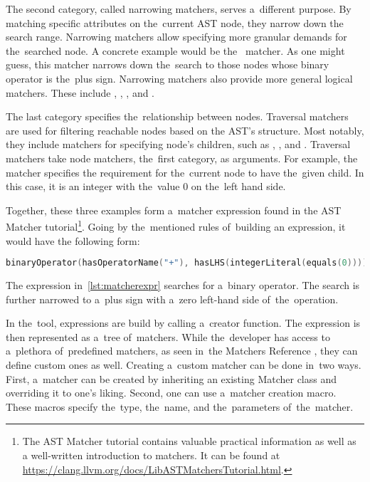 The second category, called narrowing matchers, serves a~different purpose. 
By matching specific attributes on the~current AST node, they narrow down 
the search range. 
Narrowing matchers allow specifying more granular demands for the~searched 
node. 
A concrete example would be the~ matcher. 
As one might guess, this matcher narrows down the~search to those nodes 
whose binary operator is the~plus sign. 
Narrowing matchers also provide more general logical matchers. 
These include , , , 
and .

The last category specifies the~relationship between nodes. 
Traversal matchers are used for filtering reachable nodes based on 
the AST's structure. 
Most notably, they include matchers for specifying node's children, 
such as , , and . 
Traversal matchers take node matchers, the~first category, as arguments. 
For example, the~ matcher specifies
the requirement for the~current node to have the~given child. 
In this case, it is an integer with the~value 0 on the~left hand side.

Together, these three examples form a~matcher expression found in
the AST Matcher tutorial\footnote{The AST Matcher tutorial contains 
valuable practical information as well as a well-written introduction
to matchers. It can be found at 
\url{https://clang.llvm.org/docs/LibASTMatchersTutorial.html}.}. 
Going by the~mentioned rules of~building an expression, it would have 
the following form: 

\begin{lstlisting}[caption=Matcher expression., language=C++, 
label={lst:matcherexpr}, numbers=none]
binaryOperator(hasOperatorName("+"), hasLHS(integerLiteral(equals(0)))).
\end{lstlisting}

The expression in~\ref{lst:matcherexpr} searches for a~binary operator. 
The search is further narrowed to a~plus sign with a~zero left-hand 
side of~the~operation.

In the~tool, expressions are build by calling a~creator function. 
The expression is then represented as a~tree of~matchers. 
While the~developer has access to a~plethora of~predefined matchers, 
as seen in~the Matchers Reference \citep{matchersreference:online}, 
they can define custom ones as well. 
Creating a~custom matcher can be done in~two ways. 
First, a~matcher can be created by inheriting an existing Matcher class 
and overriding it to one's liking. 
Second, one can use a~matcher creation macro. 
These macros specify the~type, the~name, and the~parameters of~the~matcher.

